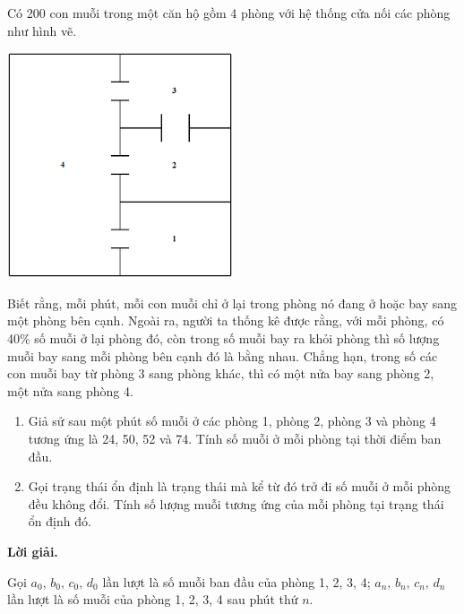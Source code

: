 \begin{tcolorbox}[title=\textbf{Bài toán B.3 + A.2.},breakable]
    Có 200 con muỗi trong một căn hộ gồm 4 phòng với hệ thống cửa nối các phòng như hình vẽ.

    \begin{center}
        \includegraphics[width=0.5\textwidth]{Figures/01.png}
    \end{center}
    
    Biết rằng, mỗi phút, mỗi con muỗi chỉ ở lại trong phòng nó đang ở hoặc bay sang một phòng bên cạnh. Ngoài ra, người ta thống kê được rằng, với mỗi phòng, có 40\% số muỗi ở lại phòng đó, còn trong số muỗi bay ra khỏi phòng thì số lượng muỗi bay sang mỗi phòng bên cạnh đó là bằng nhau. Chẳng hạn, trong số các con muỗi bay từ phòng 3 sang phòng khác, thì có một nửa bay sang phòng 2, một nửa sang phòng 4.
    
    \begin{enumerate}
            \item {Giả sử sau một phút số muỗi ở các phòng 1, phòng 2, phòng 3 và phòng 4 tương ứng là 24, 50, 52 và 74. Tính số muỗi ở mỗi phòng tại thời điểm ban đầu.}
            \item {Gọi trạng thái ổn định là trạng thái mà kể từ đó trở đi số muỗi ở mỗi phòng đều không đổi. Tính số lượng muỗi tương ứng của mỗi phòng tại trạng thái ổn định đó.}         
    \end{enumerate}
\end{tcolorbox}

\textbf{Lời giải.}

Gọi $a_0,\,b_0,\,c_0,\,d_0$ lần lượt là số muỗi ban đầu của phòng 1, 2, 3, 4; $a_n,\,b_n,\,c_n,\,d_n$ lần lượt là số muỗi của phòng 1, 2, 3, 4 sau phút thứ $n$.

